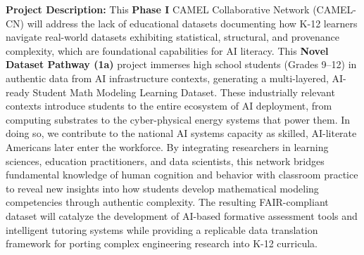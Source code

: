 \documentclass[11pt]{article}
\begin{document}
\pagestyle{empty} %

\setlength{\baselineskip}{12.6pt} 
\setlength{\normalbaselineskip}{12.6pt} 


\begin{tcolorbox}[colback=mycmykcolor, colframe=black, boxrule=1pt, coltext=black]

\textbf{Project Description:} 
This \textbf{Phase I} CAMEL Collaborative Network (CAMEL-CN) will address the lack of educational datasets documenting how K-12 learners navigate real-world datasets exhibiting statistical, structural, and provenance complexity, which are foundational capabilities for AI literacy.
This \textbf{Novel Dataset Pathway (1a)} project immerses high school students (Grades 9–12) in authentic data from AI infrastructure contexts, generating a multi-layered, AI-ready Student Math Modeling Learning Dataset.
These industrially relevant contexts introduce students to the entire ecosystem of AI deployment, from computing substrates to the cyber-physical energy systems that power them.
In doing so, we contribute to the national AI systems capacity as skilled, AI-literate Americans later enter the workforce.
By integrating researchers in learning sciences, education practitioners, and data scientists, this network bridges fundamental knowledge of human cognition and behavior with classroom practice to reveal new insights into how students develop mathematical modeling competencies through authentic complexity.
The resulting FAIR-compliant dataset will catalyze the development of AI-based formative assessment tools and intelligent tutoring systems while providing a replicable data translation framework for porting complex engineering research into K-12 curricula.

\end{tcolorbox}

\end{document}
